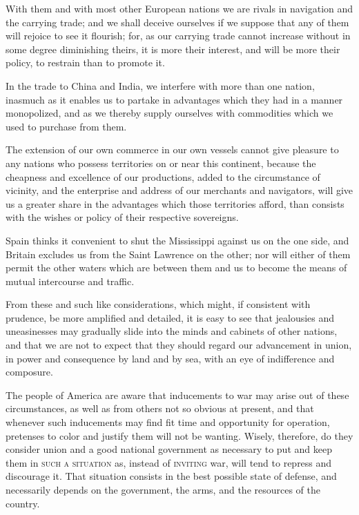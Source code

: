 With them and with most other European nations we are rivals in navigation and the carrying trade; and we shall deceive ourselves if we suppose that any of them will rejoice to see it flourish; for, as our carrying trade cannot increase without in some degree diminishing theirs, it is more their interest, and will be more their policy, to restrain than to promote it.

In the trade to China and India, we interfere with more than one nation, inasmuch as it enables us to partake in advantages which they had in a manner monopolized, and as we thereby supply ourselves with commodities which we used to purchase from them.

The extension of our own commerce in our own vessels cannot give pleasure to any nations who possess territories on or near this continent, because the cheapness and excellence of our productions, added to the circumstance of vicinity, and the enterprise and address of our merchants and navigators, will give us a greater share in the advantages which those territories afford, than consists with the wishes or policy of their respective sovereigns.

Spain thinks it convenient to shut the Mississippi against us on the one side, and Britain excludes us from the Saint Lawrence on the other; nor will either of them permit the other waters which are between them and us to become the means of mutual intercourse and traffic.

From these and such like considerations, which might, if consistent with prudence, be more amplified and detailed, it is easy to see that jealousies and uneasinesses may gradually slide into the minds and cabinets of other nations, and that we are not to expect that they should regard our advancement in union, in power and consequence by land and by sea, with an eye of indifference and composure.

The people of America are aware that inducements to war may arise out of these circumstances, as well as from others not so obvious at present, and that whenever such inducements may find fit time and opportunity for operation, pretenses to color and justify them will not be wanting. Wisely, therefore, do they consider union and a good national government as necessary to put and keep them in \textsc{such a situation }as, instead of \textsc{inviting }war, will tend to repress and discourage it. That situation consists in the best possible state of defense, and necessarily depends on the government, the arms, and the resources of the country.

